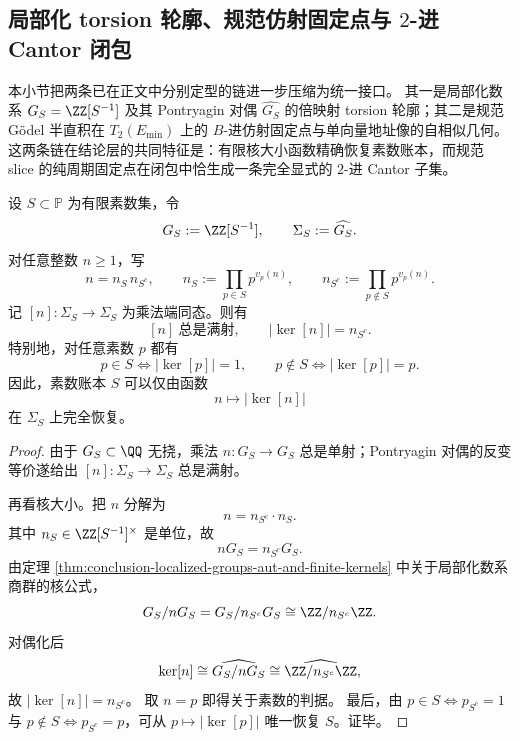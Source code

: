 \subsection{局部化 torsion 轮廓、规范仿射固定点与 \texorpdfstring{$2$}{2}-进 Cantor 闭包}\label{subsec:conclusion-localized-torsion-godel-fixedpoint-cantor-geometry}
本小节把两条已在正文中分别定型的链进一步压缩为统一接口。
其一是局部化数系 \(G_S=\ZZ[S^{-1}]\) 及其 Pontryagin 对偶 \(\widehat{G_S}\) 的倍映射 torsion 轮廓；其二是规范 Gödel 半直积在 \(T_2(E_{\min})\) 上的 \(B\)-进仿射固定点与单向量地址像的自相似几何。
这两条链在结论层的共同特征是：有限核大小函数精确恢复素数账本，而规范 slice 的纯周期固定点在闭包中恰生成一条完全显式的 \(2\)-进 Cantor 子集。

\begin{theorem}\label{thm:conclusion-localized-dual-torsion-profile-reconstructs-S}
设 \(S\subset \mathbb P\) 为有限素数集，令
\[
G_S:=\ZZ[S^{-1}],
\qquad
\Sigma_S:=\widehat{G_S}.
\]
对任意整数 \(n\ge 1\)，写
\[
n=n_S\,n_{S^c},
\qquad
n_S:=\prod_{p\in S}p^{v_p(n)},
\qquad
n_{S^c}:=\prod_{p\notin S}p^{v_p(n)}.
\]
记 \([n]:\Sigma_S\to \Sigma_S\) 为乘法端同态。则有
\[
\boxed{\;
[n]\ \text{总是满射},
\qquad
|\ker[n]|=n_{S^c}.\;}
\]
特别地，对任意素数 \(p\) 都有
\[
\boxed{\;
p\in S\iff |\ker[p]|=1,
\qquad
p\notin S\iff |\ker[p]|=p.\;}
\]
因此，素数账本 \(S\) 可以仅由函数
\[
n\longmapsto |\ker[n]|
\]
在 \(\Sigma_S\) 上完全恢复。
\end{theorem}
\begin{proof}
由于 \(G_S\subset \QQ\) 无挠，乘法 \(n:G_S\to G_S\) 总是单射；Pontryagin 对偶的反变等价遂给出 \([n]:\Sigma_S\to \Sigma_S\) 总是满射。

再看核大小。把 \(n\) 分解为
\[
n=n_{S^c}\cdot n_S.
\]
其中 \(n_S\in \ZZ[S^{-1}]^\times\) 是单位，故
\[
nG_S=n_{S^c}G_S.
\]
由定理 \ref{thm:conclusion-localized-groups-aut-and-finite-kernels} 中关于局部化数系商群的核公式，
\[
G_S/nG_S
=
G_S/n_{S^c}G_S
\cong
\ZZ/n_{S^c}\ZZ.
\]
对偶化后
\[
\ker[n]\cong \widehat{G_S/nG_S}
\cong
\widehat{\ZZ/n_{S^c}\ZZ},
\]
故 \(|\ker[n]|=n_{S^c}\)。
取 \(n=p\) 即得关于素数的判据。
最后，由 \(p\in S\iff p_{S^c}=1\) 与 \(p\notin S\iff p_{S^c}=p\)，可从 \(p\mapsto |\ker[p]|\) 唯一恢复 \(S\)。证毕。
\end{proof}


